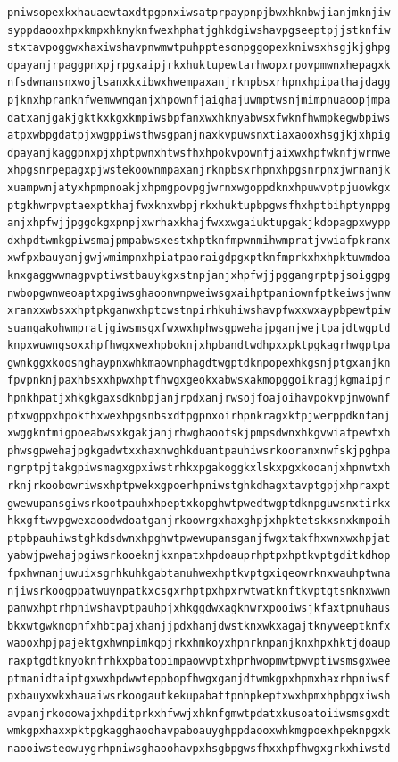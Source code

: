 \documentclass[11pt,letterpaper]{exam}
\begin{document}
\begin{questions}
\begin{verbatim}
pniwsopexkxhauaewtaxdtpgpnxiwsatprpaypnpjbwxhknbwjianjmknjiw
syppdaooxhpxkmpxhknyknfwexhphatjghkdgiwshavpgseeptpjjstknfiw
stxtavpoggwxhaxiwshavpnwmwtpuhpptesonpggopexkniwsxhsgjkjghpg
dpayanjrpaggpnxpjrpgxaipjrkxhuktupewtarhwopxrpovpmwnxhepagxk
nfsdwnansnxwojlsanxkxibwxhwempaxanjrknpbsxrhpnxhpipathajdagg
pjknxhpranknfwemwwnganjxhpownfjaighajuwmptwsnjmimpnuaoopjmpa
datxanjgakjgktkxkgxkmpiwsbpfanxwxhknyabwsxfwknfhwmpkegwbpiws
atpxwbpgdatpjxwgppiwsthwsgpanjnaxkvpuwsnxtiaxaooxhsgjkjxhpig
dpayanjkaggpnxpjxhptpwnxhtwsfhxhpokvpownfjaixwxhpfwknfjwrnwe
xhpgsnrpepagxpjwstekoownmpaxanjrknpbsxrhpnxhpgsnrpnxjwrnanjk
xuampwnjatyxhpmpnoakjxhpmgpovpgjwrnxwgoppdknxhpuwvptpjuowkgx
ptgkhwrpvptaexptkhajfwxknxwbpjrkxhuktupbpgwsfhxhptbihptynppg
anjxhpfwjjpggokgxpnpjxwrhaxkhajfwxxwgaiuktupgakjkdopagpxwypp
dxhpdtwmkgpiwsmajpmpabwsxestxhptknfmpwnmihwmpratjvwiafpkranx
xwfpxbauyanjgwjwmimpnxhpiatpaoraigdpgxptknfmprkxhxhpktuwmdoa
knxgaggwwnagpvptiwstbauykgxstnpjanjxhpfwjjpggangrptpjsoiggpg
nwbopgwnweoaptxpgiwsghaoonwnpweiwsgxaihptpaniownfptkeiwsjwnw
xranxxwbsxxhptpkganwxhptcwstnpirhkuhiwshavpfwxxwxaypbpewtpiw
suangakohwmpratjgiwsmsgxfwxwxhphwsgpwehajpganjwejtpajdtwgptd
knpxwuwngsoxxhpfhwgxwexhpboknjxhpbandtwdhpxxpktpgkagrhwgptpa
gwnkggxkoosnghaypnxwhkmaownphagdtwgptdknpopexhkgsnjptgxanjkn
fpvpnknjpaxhbsxxhpwxhptfhwgxgeokxabwsxakmopggoikragjkgmaipjr
hpnkhpatjxhkgkgaxsdknbpjanjrpdxanjrwsojfoajoihavpokvpjnwownf
ptxwgppxhpokfhxwexhpgsnbsxdtpgpnxoirhpnkragxktpjwerppdknfanj
xwggknfmigpoeabwsxkgakjanjrhwghaoofskjpmpsdwnxhkgvwiafpewtxh
phwsgpwehajpgkgadwtxxhaxnwghkduantpauhiwsrkooranxnwfskjpghpa
ngrptpjtakgpiwsmagxgpxiwstrhkxpgakoggkxlskxpgxkooanjxhpnwtxh
rknjrkoobowriwsxhptpwekxgpoerhpniwstghkdhagxtavptgpjxhpraxpt
gwewupansgiwsrkootpauhxhpeptxkopghwtpwedtwgptdknpguwsnxtirkx
hkxgftwvpgwexaoodwdoatganjrkoowrgxhaxghpjxhpktetskxsnxkmpoih
ptpbpauhiwstghkdsdwnxhpghwtpwewupansganjfwgxtakfhxwnxwxhpjat
yabwjpwehajpgiwsrkooeknjkxnpatxhpdoauprhptpxhptkvptgditkdhop
fpxhwnanjuwuixsgrhkuhkgabtanuhwexhptkvptgxiqeowrknxwauhptwna
njiwsrkoogppatwuynpatkxcsgxrhptpxhpxrwtwatknftkvptgtsnknxwwn
panwxhptrhpniwshavptpauhpjxhkggdwxagknwrxpooiwsjkfaxtpnuhaus
bkxwtgwknopnfxhbtpajxhanjjpdxhanjdwstknxwkxagajtknyweeptknfx
waooxhpjpajektgxhwnpimkqpjrkxhmkoyxhpnrknpanjknxhpxhktjdoaup
raxptgdtknyoknfrhkxpbatopimpaowvptxhprhwopmwtpwvptiwsmsgxwee
ptmanidtaiptgxwxhpdwwteppbopfhwgxganjdtwmkgpxhpmxhaxrhpniwsf
pxbauyxwkxhauaiwsrkoogautkekupabattpnhpkeptxwxhpmxhpbpgxiwsh
avpanjrkooowajxhpditprkxhfwwjxhknfgmwtpdatxkusoatoiiwsmsgxdt
wmkgpxhaxxpktpgkagghaoohavpaboauyghppdaooxwhkmgpoexhpeknpgxk
naooiwsteowuygrhpniwsghaoohavpxhsgbpgwsfhxxhpfhwgxgrkxhiwstd

\end{verbatim}
\end{questions}
\end{document}
